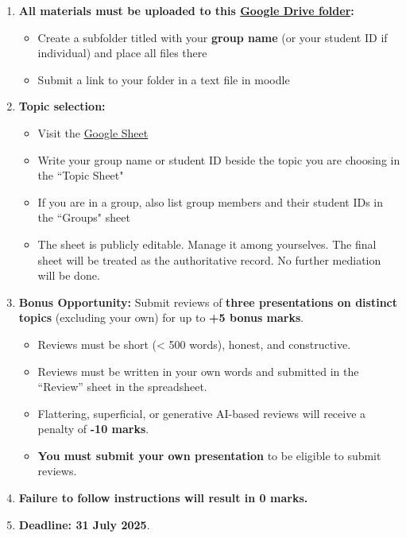 \documentclass[10pt,answers]{exam}
\begin{document}
\begin{enumerate}[leftmargin=0.6cm]
  \item \textbf{All materials must be uploaded to this \href{https://drive.google.com/drive/folders/1ML6WZruHu89Cj47HePLaejBWfE4kCOdx?usp=sharing}{Google Drive folder}:}
    \begin{itemize}
      \item Create a subfolder titled with your \textbf{group name} (or your student ID if individual) and place all files there
      \item Submit a link to your folder in a text file in moodle
    \end{itemize}

  \item \textbf{Topic selection:}
    \begin{itemize}
      \item Visit the \href{https://docs.google.com/spreadsheets/d/1u53Q3IpKolDNdgppDxxXberWJHSxwfAub1AxBailzJA/edit?usp=sharing}{Google Sheet}
      \item Write your group name or student ID beside the topic you are choosing in the “Topic Sheet"
      \item If you are in a group, also list group members and their student IDs in the “Groups" sheet
      \item The sheet is publicly editable. Manage it among yourselves. The final sheet will be treated as the authoritative record. No further mediation will be done.
    \end{itemize}

  \item \textbf{Bonus Opportunity:} Submit reviews of \textbf{three presentations on distinct topics} (excluding your own) for up to \textbf{+5 bonus marks}.
    \begin{itemize}
      \item Reviews must be short (\textless{} 500 words), honest, and constructive.
      \item Reviews must be written in your own words and submitted in the “Review” sheet in the spreadsheet.
      \item Flattering, superficial, or generative AI-based reviews will receive a penalty of \textbf{-10 marks}.
      \item \textbf{You must submit your own presentation} to be eligible to submit reviews.
    \end{itemize}

  \item \textbf{Failure to follow instructions will result in 0 marks.}

  \item \textbf{Deadline: \textbf{31 July 2025}}.
\end{enumerate}
\end{document}
